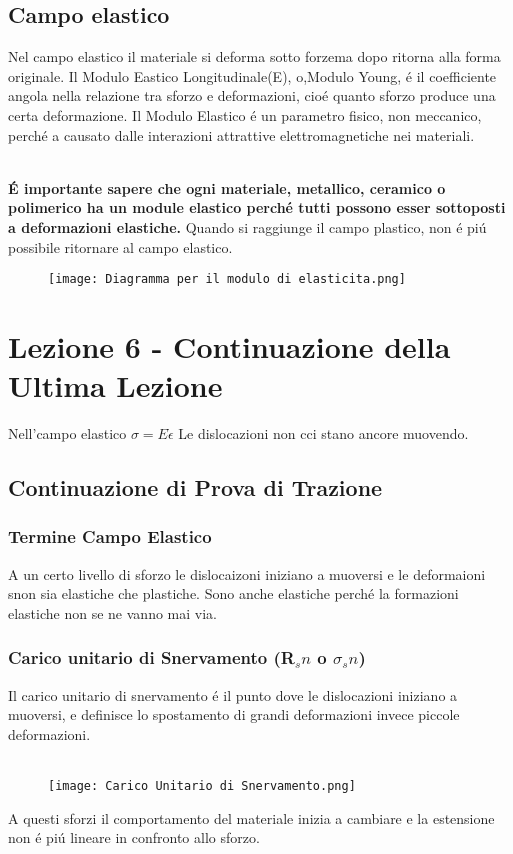 \documentclass{article}
\begin{document}
        \subsection{Campo elastico}
            Nel campo elastico il materiale si deforma sotto forzema dopo ritorna alla forma originale. Il Modulo Eastico Longitudinale(E), o,Modulo Young, \'e il coefficiente angola nella relazione tra sforzo e deformazioni, cio\'e quanto sforzo produce una certa deformazione. Il Modulo Elastico \'e un parametro fisico, non meccanico, perch\'e a causato dalle interazioni attrattive elettromagnetiche nei materiali.\\ \\
            {\textbf{\'E importante sapere che ogni materiale, metallico, ceramico o polimerico ha un module elastico perch\'e tutti possono esser sottoposti a deformazioni elastiche.} Quando si raggiunge il campo plastico, non \'e pi\'u possibile ritornare al campo elastico.
            \begin{figure}[!h]
                \centering
                \texttt{[image: Diagramma per il modulo di elasticita.png]}
            \end{figure}        
    \section{Lezione 6 - Continuazione della Ultima Lezione}
        Nell'campo elastico $\sigma = E \dot \epsilon$
        Le dislocazioni non cci stano ancore muovendo.
        \subsection{Continuazione di Prova di Trazione}
            \subsubsection{Termine Campo Elastico}
                A un certo livello di sforzo le dislocaizoni iniziano a muoversi e le deformaioni snon sia elastiche che plastiche. Sono anche elastiche perch\'e la formazioni elastiche non se ne vanno mai via.
            \subsubsection{Carico unitario di Snervamento (R$_sn$ o $\sigma_sn$)}
                Il carico unitario di snervamento \'e il punto dove le dislocazioni iniziano a muoversi, e definisce lo spostamento di grandi deformazioni invece piccole deformazioni.\\ \\
                \begin{figure}[!h]
                    \centering
                    \texttt{[image: Carico Unitario di Snervamento.png]}
                \end{figure}
                A questi sforzi il comportamento del materiale inizia a cambiare e la estensione non \'e pi\'u lineare in confronto allo sforzo.
}
\end{document}
